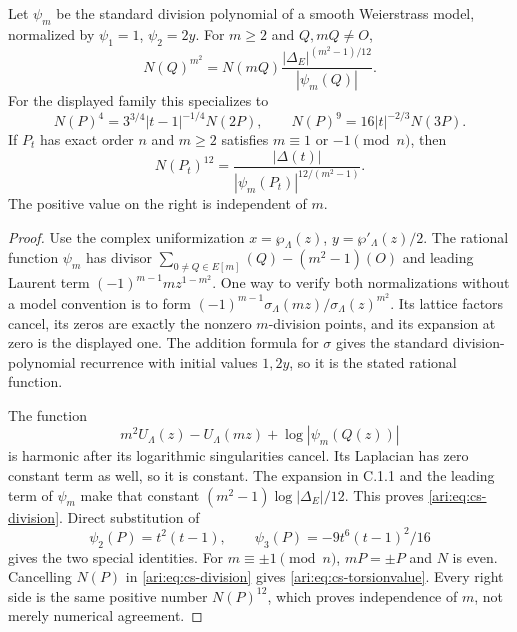 \begin{proposition}\label{ari:C.4.2}
Let $\psi_m$ be the standard division polynomial of a smooth
Weierstrass model, normalized by $\psi_1=1$, $\psi_2=2y$.
For $m\ge2$ and $Q,mQ\ne O$,
\begin{equation}\label{ari:eq:cs-division}
 N(Q)^{m^2}
       =N(mQ)\frac{|\Delta_E|^{(m^2-1)/12}}{|\psi_m(Q)|}.
\end{equation}
For the displayed family this specializes to
\[
 N(P)^4=3^{3/4}|t-1|^{-1/4}N(2P),\qquad
 N(P)^9=16|t|^{-2/3}N(3P).
\]
If $P_t$ has exact order $n$ and $m\ge2$ satisfies
$m\equiv1$ or $-1\pmod n$, then
\begin{equation}\label{ari:eq:cs-torsionvalue}
 N(P_t)^{12}
       =\frac{|\Delta(t)|}{|\psi_m(P_t)|^{12/(m^2-1)}}.
\end{equation}
The positive value on the right is independent of $m$.
\end{proposition}
\begin{proof}
Use the complex uniformization $x=\wp_\Lambda(z)$,
$y=\wp'_\Lambda(z)/2$. The rational function $\psi_m$ has divisor
$\sum_{0\ne Q\in E[m]}(Q)-(m^2-1)(O)$ and leading Laurent term
$(-1)^{m-1}m z^{1-m^2}$. One way to verify both normalizations without
a model convention is to form
$(-1)^{m-1}\sigma_\Lambda(mz)/\sigma_\Lambda(z)^{m^2}$.
Its lattice factors cancel, its zeros are exactly the nonzero
$m$-division points, and its expansion at zero is the displayed
one. The addition formula for $\sigma$ gives the standard
division-polynomial recurrence with initial values $1,2y$, so it is
the stated rational function.

The function
\[
 m^2U_\Lambda(z)-U_\Lambda(mz)
                    +\log|\psi_m(Q(z))|
\]
is harmonic after its logarithmic singularities cancel. Its
Laplacian has zero constant term as well, so it is constant.
The expansion in C.1.1 and the leading term of $\psi_m$ make that
constant $(m^2-1)\log|\Delta_E|/12$. This proves
\eqref{ari:eq:cs-division}. Direct substitution of
\[
 \psi_2(P)=t^2(t-1),\qquad
 \psi_3(P)=-9t^6(t-1)^2/16
\]
gives the two special identities. For $m\equiv\pm1\pmod n$,
$mP=\pm P$ and $N$ is even. Cancelling $N(P)$ in
\eqref{ari:eq:cs-division} gives \eqref{ari:eq:cs-torsionvalue}.
Every right side is the same positive number $N(P)^{12}$, which
proves independence of $m$, not merely numerical agreement.
\end{proof}

